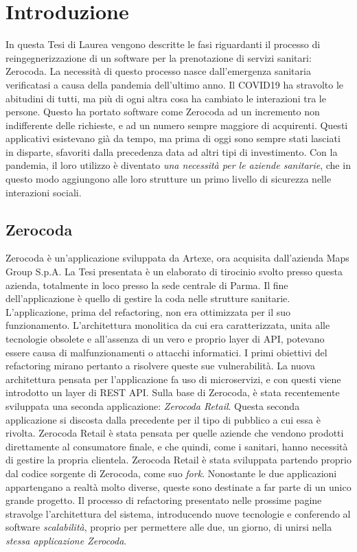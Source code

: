\chapter*{Introduzione}
\label{chap:introduction}
In questa Tesi di Laurea vengono descritte le fasi riguardanti il processo di reingegnerizzazione di un software per la prenotazione di servizi sanitari: Zerocoda. La necessità di questo processo nasce dall'emergenza sanitaria verificatasi a causa della pandemia dell'ultimo anno. Il COVID19 ha stravolto le abitudini di tutti, ma più di ogni altra cosa ha cambiato le interazioni tra le persone. Questo ha portato software come Zerocoda ad un incremento non indifferente delle richieste, e ad un numero sempre maggiore di acquirenti. Questi applicativi esistevano già da tempo, ma prima di oggi sono sempre stati lasciati in disparte, sfavoriti dalla precedenza data ad altri tipi di investimento. Con la pandemia, il loro utilizzo è diventato \emph{una necessità per le aziende sanitarie}, che in questo modo aggiungono alle loro strutture un primo livello di sicurezza nelle interazioni sociali.

\section*{Zerocoda}
Zerocoda è un'applicazione sviluppata da Artexe, ora acquisita dall'azienda Maps Group S.p.A. La Tesi presentata è un elaborato di tirocinio svolto presso questa azienda, totalmente in loco presso la sede centrale di Parma. Il fine dell'applicazione è quello di gestire la coda nelle strutture sanitarie. L'applicazione, prima del refactoring, non era ottimizzata per il suo funzionamento. L'architettura monolitica da cui era caratterizzata, unita alle tecnologie obsolete e all'assenza di un vero e proprio layer di API, potevano essere causa di malfunzionamenti o attacchi informatici. I primi obiettivi del refactoring mirano pertanto a risolvere queste sue vulnerabilità. La nuova architettura pensata per l'applicazione fa uso di microservizi, e con questi viene introdotto un layer di REST API.  Sulla base di Zerocoda, è stata recentemente sviluppata una seconda applicazione: \emph{Zerocoda Retail}. Questa seconda applicazione si discosta dalla precedente per il tipo di pubblico a cui essa è rivolta. Zerocoda Retail è stata pensata per quelle aziende che vendono prodotti direttamente al consumatore finale, e che quindi, come i sanitari, hanno necessità di gestire la propria clientela. Zerocoda Retail è stata sviluppata partendo proprio dal codice sorgente di Zerocoda, come suo \emph{fork}. Nonostante le due applicazioni appartengano a realtà molto diverse, queste sono destinate a far parte di un unico grande progetto. Il processo di refactoring presentato nelle prossime pagine stravolge l'architettura del sistema, introducendo nuove tecnologie e conferendo al software \emph{scalabilità}, proprio per permettere alle due, un giorno, di unirsi nella \emph{stessa applicazione Zerocoda}.

